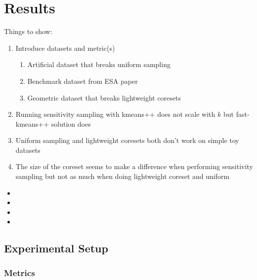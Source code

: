 \section{Results}
Things to show:
\begin{enumerate}
    \item Introduce datasets and metric(s)
    \begin{enumerate}
        \item Artificial dataset that breaks uniform sampling
        \item Benchmark dataset from ESA paper
        \item Geometric dataset that breaks lightweight coresets
    \end{enumerate}
    \item Running sensitivity sampling with kmeans++ does not scale with $k$ but fast-kmeans++ solution does
    \item Uniform sampling and lightweight coresets both don't work on simple toy datasets
    \item The size of the coreset seems to make a difference when performing sensitivity sampling but not as much
          when doing lightweight coreset and uniform
\end{enumerate}

\begin{itemize}
\item {}
\item {}
\item {}
\item {}
\end{itemize}


\subsection{Experimental Setup}
\subsubsection{Metrics}

